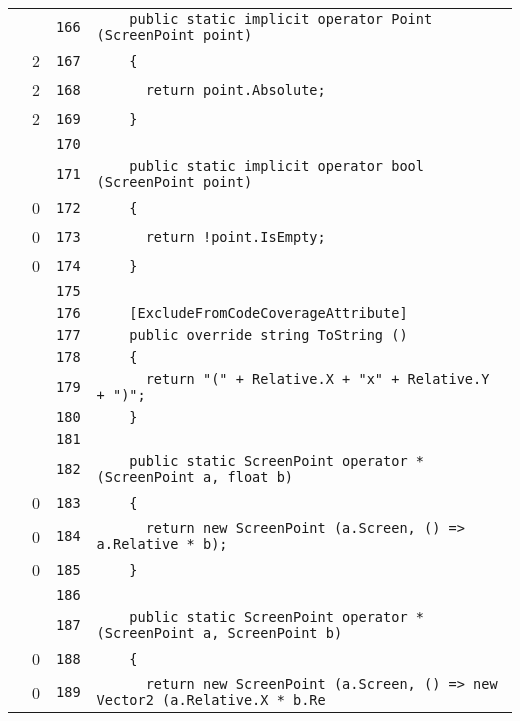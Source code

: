 \documentclass[a4paper,10pt]{article}
\begin{document}
\begin{longtable}[l]{lrrl}
\cellcolor{gray} &  & \verb~166~ & \verb~    public static implicit operator Point (ScreenPoint point)~\\
\cellcolor{green} & 2 & \verb~167~ & \verb~    {~\\
\cellcolor{green} & 2 & \verb~168~ & \verb~      return point.Absolute;~\\
\cellcolor{green} & 2 & \verb~169~ & \verb~    }~\\
\cellcolor{gray} &  & \verb~170~ & \verb~~\\
\cellcolor{gray} &  & \verb~171~ & \verb~    public static implicit operator bool (ScreenPoint point)~\\
\cellcolor{red} & 0 & \verb~172~ & \verb~    {~\\
\cellcolor{red} & 0 & \verb~173~ & \verb~      return !point.IsEmpty;~\\
\cellcolor{red} & 0 & \verb~174~ & \verb~    }~\\
\cellcolor{gray} &  & \verb~175~ & \verb~~\\
\cellcolor{gray} &  & \verb~176~ & \verb~    [ExcludeFromCodeCoverageAttribute]~\\
\cellcolor{gray} &  & \verb~177~ & \verb~    public override string ToString ()~\\
\cellcolor{gray} &  & \verb~178~ & \verb~    {~\\
\cellcolor{gray} &  & \verb~179~ & \verb~      return "(" + Relative.X + "x" + Relative.Y + ")";~\\
\cellcolor{gray} &  & \verb~180~ & \verb~    }~\\
\cellcolor{gray} &  & \verb~181~ & \verb~~\\
\cellcolor{gray} &  & \verb~182~ & \verb~    public static ScreenPoint operator * (ScreenPoint a, float b)~\\
\cellcolor{red} & 0 & \verb~183~ & \verb~    {~\\
\cellcolor{red} & 0 & \verb~184~ & \verb~      return new ScreenPoint (a.Screen, () => a.Relative * b);~\\
\cellcolor{red} & 0 & \verb~185~ & \verb~    }~\\
\cellcolor{gray} &  & \verb~186~ & \verb~~\\
\cellcolor{gray} &  & \verb~187~ & \verb~    public static ScreenPoint operator * (ScreenPoint a, ScreenPoint b)~\\
\cellcolor{red} & 0 & \verb~188~ & \verb~    {~\\
\cellcolor{red} & 0 & \verb~189~ & \verb~      return new ScreenPoint (a.Screen, () => new Vector2 (a.Relative.X * b.Re~\\

\end{longtable}
\end{document}
